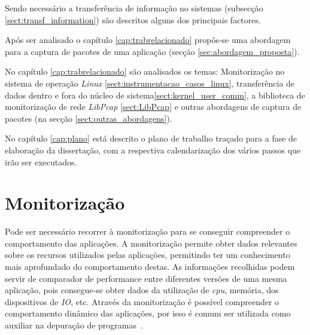 Sendo necessário a transferência de informação no sistemas (subsecção \ref{sect:transf_information}) são descritos alguns dos principais factores.

Após ser analisado o capítulo \ref{cap:trabrelacionado} propôs-se uma abordagem para a captura de pacotes de uma aplicação (secção \ref{sec:abordagem_proposta}).

No capítulo \ref{cap:trabrelacionado} são analisados os temas: Monitorização no sistema de operação \textit{Linux} \ref{sect:instrumentacao_casos_linux}, transferência de dados dentro e fora do núcleo de sistema\ref{sect:kernel_user_comm}, a biblioteca de monitorização de rede \textit{LibPcap} \ref{sect:LibPcap} e outras abordagens de captura de pacotes (na secção \ref{sect:outras_abordagens}).

No capítulo \ref{cap:plano} está descrito o plano de trabalho traçado para a fase de elaboração da dissertação, com a respectiva calendarização dos vários passos que irão ser executados.

 

\section{Monitorização} \label{sect:descricao}

Pode ser necessário recorrer à monitorização para se conseguir compreender o comportamento das aplicações.
A monitorização permite obter dados relevantes sobre os recursos utilizados pelas aplicações, permitindo ter um conhecimento mais aprofundado do comportamento destas.
As informações recolhidas podem servir de comparador de performance entre diferentes versões de uma mesma aplicação, pois consegue-se obter dados da utilização de \textit{cpu}, memória, dos dispositivos de \textit{IO}, etc.
Através da monitorização é possível compreender o comportamento dinâmico das aplicações, por isso é comum ser utilizada como auxiliar  na depuração de programas~\cite{DuartePhd05}.

